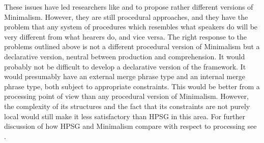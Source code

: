\documentclass[output=paper
                ,modfonts
                ,nonflat
	        ,collection
	        ,collectionchapter
	        ,collectiontoclongg
 	        ,biblatex
                ,babelshorthands
                ,newtxmath
                ,draftmode
                ,colorlinks, citecolor=brown
]{./langsci/langscibook}
\begin{document}
These issues have led researchers like \citet{Phillips2003a} and \citet{Chesi2015a-u} to propose rather different
versions of Minimalism. However, they are still procedural approaches, and they have the problem
that any system of procedures which resembles what speakers do will be very different from what
hearers do, and vice versa. The right response to the problems outlined above is not a different
procedural version of Minimalism but a declarative version, neutral between production and
comprehension. It would probably not be difficult to develop a declarative version of the
framework. It would presumably have an external merge phrase type and an internal merge phrase type,
both subject to appropriate constraints. This would be better from a processing point of view than
any procedural version of Minimalism. However, the complexity of its structures and the fact that
its constraints are not purely local would still make it less satisfactory than HPSG in this area.
For further discussion of how HPSG and Minimalism compare with respect to processing see .




\end{document}
